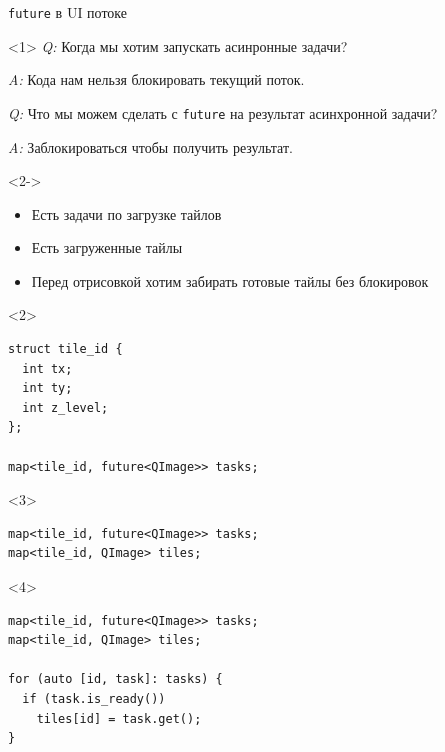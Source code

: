 \documentclass[aspectratio=169,pdf,hyperref={unicode},14pt]{beamer}
\begin{document}
\begin{frame}[fragile,t]{\texttt{future} в UI потоке}
\begin{onlyenv}<1>
{\em Q:} Когда мы хотим запускать асинронные задачи?

{\em A:} Кода нам нельзя блокировать текущий поток.

{\em Q:} Что мы можем сделать с \texttt{future} на результат асинхронной задачи?

{\em A:} Заблокироваться чтобы получить результат.
\end{onlyenv}
\begin{onlyenv}<2->
 \begin{itemize}
  \item<2-> Есть задачи по загрузке тайлов
  \item<3-> Есть загруженные тайлы
  \item<4-> Перед отрисовкой хотим забирать готовые тайлы без блокировок
 \end{itemize}
\begin{onlyenv}<2>
 \begin{lstlisting}[style=cppcode]
struct tile_id {
  int tx;
  int ty;
  int z_level;
};

map<tile_id, future<QImage>> tasks;
 \end{lstlisting}
\end{onlyenv}
\begin{onlyenv}<3>
 \begin{lstlisting}[style=cppcode]
map<tile_id, future<QImage>> tasks;
map<tile_id, QImage> tiles;
 \end{lstlisting}
\end{onlyenv}
\begin{onlyenv}<4>
 \begin{lstlisting}[style=cppcode]
map<tile_id, future<QImage>> tasks;
map<tile_id, QImage> tiles;

for (auto [id, task]: tasks) {
  if (task.is_ready())
    tiles[id] = task.get();
}
 \end{lstlisting}
\end{onlyenv}
\end{onlyenv}
\end{frame}
\end{document}
